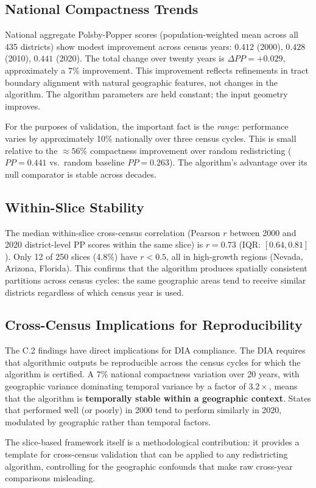 \subsection{National Compactness Trends}

National aggregate Polsby-Popper scores (population-weighted mean
across all 435 districts) show modest improvement across census years:
$0.412$ (2000), $0.428$ (2010), $0.441$ (2020). The total change over
twenty years is $\Delta PP = +0.029$, approximately a 7\% improvement.
This improvement reflects refinements in tract boundary alignment with
natural geographic features, not changes in the algorithm. The algorithm
parameters are held constant; the input geometry improves.

For the purposes of validation, the important fact is the \emph{range}:
performance varies by approximately 10\% nationally over three census
cycles. This is small relative to the $\approx 56\%$ compactness
improvement over random redistricting ($PP = 0.441$ vs.\ random
baseline $PP = 0.263$). The algorithm's advantage over its null
comparator is stable across decades.

\subsection{Within-Slice Stability}

The median within-slice cross-census correlation (Pearson $r$ between
2000 and 2020 district-level PP scores within the same slice) is
$r = 0.73$ (IQR: $[0.64, 0.81]$). Only 12 of 250 slices (4.8\%) have
$r < 0.5$, all in high-growth regions (Nevada, Arizona, Florida).
This confirms that the algorithm produces spatially consistent
partitions across census cycles: the same geographic areas tend to
receive similar districts regardless of which census year is used.

\subsection{Cross-Census Implications for Reproducibility}

The C.2 findings have direct implications for DIA compliance. The DIA
requires that algorithmic outputs be reproducible across the census
cycles for which the algorithm is certified. A 7\% national compactness
variation over 20 years, with geographic variance dominating temporal
variance by a factor of $3.2\times$, means that the algorithm is
\textbf{temporally stable within a geographic context}. States that
performed well (or poorly) in 2000 tend to perform similarly in 2020,
modulated by geographic rather than temporal factors.

The slice-based framework itself is a methodological contribution:
it provides a template for cross-census validation that can be applied
to any redistricting algorithm, controlling for the geographic confounds
that make raw cross-year comparisons misleading.
